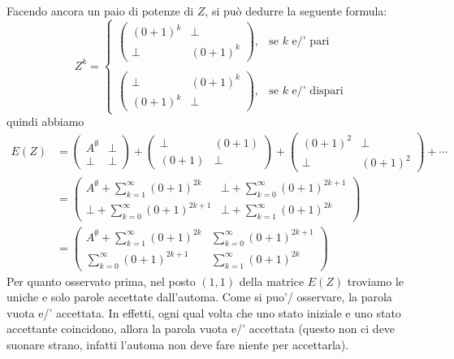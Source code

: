\begin{exam}
    Facendo ancora un paio di potenze di $Z$, 
    si può dedurre la seguente formula:
    \[
    Z^k=
    \left\{
    \begin{matrix}
        \begin{pmatrix}
            (0+1)^k & \bot
            \\
            \bot & (0+1)^k
        \end{pmatrix}
        ,& \text{se } k \text{ e/' pari}
        \\
        \\
        \begin{pmatrix}
            \bot & (0+1)^k
            \\
            (0+1)^k & \bot
        \end{pmatrix}
        ,& \text{se } k \text{ e/' dispari}
    \end{matrix}
    \right.
    \]
    quindi abbiamo
    \begin{align*}
    E(Z)&=
    \begin{pmatrix}
        A^\emptyset & \bot
        \\
        \bot & \bot
    \end{pmatrix}
    +
    \begin{pmatrix}
            \bot & (0+1)
            \\
            (0+1) & \bot
    \end{pmatrix}
    +
    \begin{pmatrix}
            (0+1)^2 & \bot
            \\
            \bot & (0+1)^2
        \end{pmatrix}
    + \cdots
    \\&=
    \begin{pmatrix}
        A^\emptyset + \sum_{k =1}^{\infty}(0+1)^{2k} & \bot + \sum_{k =0}^{\infty}(0+1)^{2k+1}
        \\
        \bot + \sum_{k =0}^{\infty}(0+1)^{2k+1} &  \bot + \sum_{k =1}^{\infty}(0+1)^{2k} 
    \end{pmatrix}
    \\&=
    \begin{pmatrix}
        A^\emptyset + \sum_{k =1}^{\infty}(0+1)^{2k} & \sum_{k =0}^{\infty}(0+1)^{2k+1}
        \\
        \sum_{k =0}^{\infty}(0+1)^{2k+1} &   \sum_{k =1}^{\infty}(0+1)^{2k} 
    \end{pmatrix}
    \end{align*}
    Per quanto osservato prima,
    nel posto $(1,1)$ della matrice
    $E(Z)$ troviamo le uniche e solo parole accettate dall'automa.
    Come si puo'/ osservare, la parola vuota e/' accettata.
    In effetti, ogni qual volta che uno stato iniziale e uno stato accettante coincidono,
    allora la parola vuota e/' accettata 
    (questo non ci deve suonare strano, infatti l'automa non deve fare niente per accettarla).
\end{exam}
